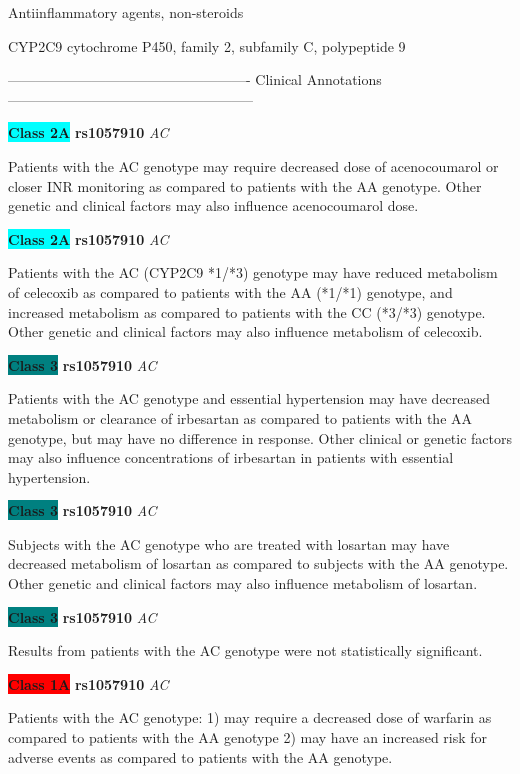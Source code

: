 \documentclass{resume} %
\begin{document}
\begin{rSection}{ Antiinflammatory agents, non-steroids }
\begin{rSubsection}{ CYP2C9 }{ cytochrome P450, family 2, subfamily C, polypeptide 9 }{}{}
\item[]

\item[] ---------------------------------------------------- Clinical Annotations -----------------------------------------------------\newline
\item \textbf{\colorbox{cyan} {Class 2A}} \textbf{ rs1057910 } \textit{ AC }
\item[] Patients with the AC genotype may require decreased dose of acenocoumarol or closer INR monitoring as compared to patients with the AA genotype. Other genetic and clinical factors may also influence acenocoumarol dose.\item \textbf{\colorbox{cyan} {Class 2A}} \textbf{ rs1057910 } \textit{ AC }
\item[] Patients with the AC (CYP2C9 *1/*3) genotype may have reduced metabolism of celecoxib as compared to patients with the AA (*1/*1) genotype, and increased metabolism as compared to patients with the CC (*3/*3) genotype. Other genetic and clinical factors may also influence metabolism of celecoxib. \item \textbf{\colorbox{teal} {Class 3}} \textbf{ rs1057910 } \textit{ AC }
\item[] Patients with the AC genotype and essential hypertension may have decreased metabolism or clearance of irbesartan as compared to patients with the AA genotype, but may have no difference in response. Other clinical or genetic factors may also influence concentrations of irbesartan in patients with essential hypertension. \item \textbf{\colorbox{teal} {Class 3}} \textbf{ rs1057910 } \textit{ AC }
\item[] Subjects with the AC genotype who are treated with losartan may have decreased metabolism of losartan as compared to subjects with the AA genotype. Other genetic and clinical factors may also influence metabolism of losartan.\item \textbf{\colorbox{teal} {Class 3}} \textbf{ rs1057910 } \textit{ AC }
\item[] Results from patients with the AC genotype were not statistically significant.\item \textbf{\colorbox{red} {Class 1A}} \textbf{ rs1057910 } \textit{ AC }
\item[] Patients with the AC genotype: 1) may require a decreased dose of warfarin as compared to patients with the AA genotype 2) may have an increased risk for adverse events as compared to patients with the AA genotype.
\end{rSubsection}


\end{rSection}
\end{document}
